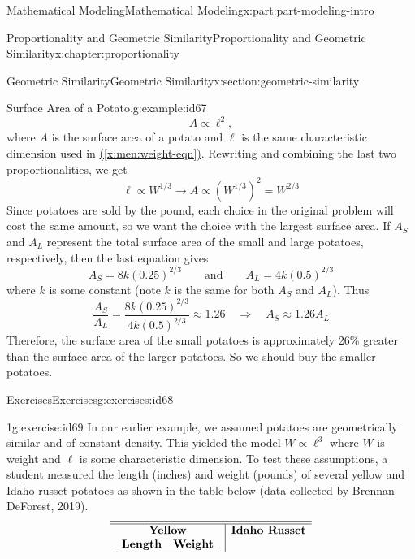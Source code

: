 \documentclass[oneside,10pt,]{book}
\newcommand{\xreffont}{\relax}
\numberwithin{equation}{section}
\begin{document}
\begin{partptx}{Mathematical Modeling}{}{Mathematical Modeling}{}{}{x:part:part-modeling-intro}
\begin{chapterptx}{Proportionality and Geometric Similarity}{}{Proportionality and Geometric Similarity}{}{}{x:chapter:proportionality}
\begin{sectionptx}{Geometric Similarity}{}{Geometric Similarity}{}{}{x:section:geometric-similarity}
\begin{example}{Surface Area of a Potato.}{g:example:id67}
\begin{equation*}
A\propto \ell^2,
\end{equation*}
where \(A\) is the surface area of a potato and \(\ell\) is the same characteristic dimension used in \hyperref[x:men:weight-eqn]{({\xreffont\ref{x:men:weight-eqn}})}. Rewriting and combining the last two proportionalities, we get%
%
\begin{equation*}
\ell \propto W^{1/3} \longrightarrow A \propto\left(W^{1/3}\right)^2 = W^{2/3}
\end{equation*}
Since potatoes are sold by the pound, each choice in the original problem will cost the same amount, so we want the choice with the largest surface area. If \(A_S\) and \(A_L\) represent the total surface area of the small and large potatoes, respectively, then the last equation gives%
%
\begin{equation*}
A_S = 8k(0.25)^{2/3} \qquad\text{and}\qquad A_L = 4k(0.5)^{2/3}
\end{equation*}
where \(k\) is some constant (note \(k\) is the same for both \(A_S\) and \(A_L\)). Thus%
%
\begin{equation*}
\frac{A_S}{A_L} = \frac{8k(0.25)^{2/3}}{4k(0.5)^{2/3}}\approx 1.26 \quad\Longrightarrow \quad A_S\approx 1.26 A_L
\end{equation*}
Therefore, the surface area of the small potatoes is approximately 26\% greater than the surface area of the larger potatoes. So we should buy the smaller potatoes.%
\end{example}
%
%
\typeout{************************************************}
\typeout{************************************************}
%
\begin{exercises-subsection-numberless}{Exercises}{}{Exercises}{}{}{g:exercises:id68}
\begin{divisionexercise}{1}{}{}{g:exercise:id69}%
In our earlier example, we assumed potatoes are geometrically similar and of constant density. This yielded the model \(W\propto \ell^3\) where \(W\) is weight and \(\ell\) is some characteristic dimension. To test these assumptions, a student measured the length (inches) and weight (pounds) of several yellow and Idaho russet potatoes as shown in the table below (data collected by Brennan DeForest, 2019).%
%
\begin{equation*}
\begin{array}{c|c}\hline\hline
\textbf{Yellow} & \textbf{Idaho Russet} \\
\begin{array}{cc}
\textbf{Length} & \textbf{Weight} \\\hline

\end{array}
\end{array}
\end{equation*}
\end{divisionexercise}
\end{exercises-subsection-numberless}
\end{sectionptx}
\end{chapterptx}
\end{partptx}
\end{document}
